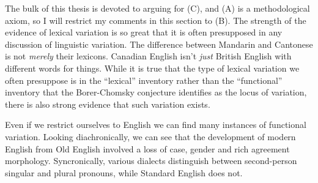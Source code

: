 \documentclass[MilwayThesis]{subfiles}
\begin{document}
The bulk of this thesis is devoted to arguing for (C), and (A) is a methodological axiom, so I will restrict my comments in this section to (B).
The strength of the evidence of lexical variation is so great that it is often presupposed in any discussion of linguistic variation.
The difference between Mandarin and Cantonese is not \textit{merely} their lexicons.
Canadian English isn't \textit{just} British English with different words for things.
While it is true that the type of lexical variation we often presuppose is in the ``lexical'' inventory rather than the ``functional'' inventory that the Borer-Chomsky conjecture identifies as the locus of variation, there is also strong evidence that such variation exists.

Even if we restrict ourselves to English we can find many instances of functional variation.
Looking diachronically, we can see that the development of modern English from Old English involved a loss of case, gender and rich agreement morphology.
Syncronically, various dialects distinguish between second-person singular and plural pronouns, while Standard English does not.


%
%
%
%
\end{document}
